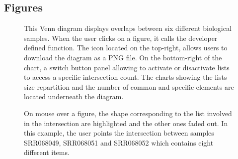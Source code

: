 \documentclass{bmcart}
\begin{document}
\begin{backmatter}

\section*{Figures}
  \begin{figure}[h!]
  \caption{
      This Venn diagram displays overlaps between six different biological samples. When 
      the user clicks on a figure, it calls the developer defined function. 
      The icon located on the top-right, allows users to download the diagram as a PNG 
      file. On the bottom-right of the chart, a switch button panel allowing to activate or 
      disactivate lists to access a specific intersection count. The charts showing the lists 
      size repartition and the number of common and specific elements are located underneath the
      diagram.}
      \end{figure}

\begin{figure}[h!]
  \caption{
      On mouse over a figure, the shape corresponding to the list involved in the intersection
      are highlighted and the other ones faded out. In this example, the user points the
      intersection between samples SRR068049, SRR068051 and SRR068052 which contains eight 
      different items.}
      \end{figure}



\end{backmatter}
\end{document}
